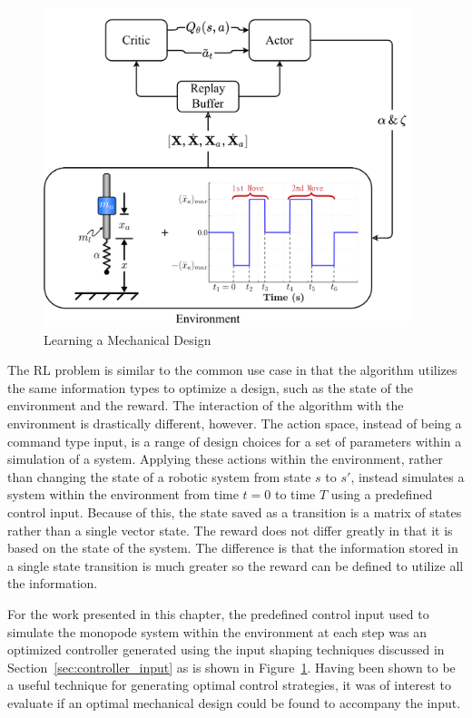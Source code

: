 % 
\begin{figure}[tb!]
        \centering
        \includegraphics[width=0.95\textwidth]{figures/Ch4/TD3_Mech_Params.drawio.png}  
        \caption{Learning a Mechanical Design}
        \label{fig:TD3_mech_design}
\end{figure}
% 

The RL problem is similar to the common use case in that the algorithm utilizes the same information types to optimize a design, such as the state of the environment and the reward. The interaction of the algorithm with the environment is drastically different, however. The action space, instead of being a command type input, is a range of design choices for a set of parameters within a simulation of a system. Applying these actions within the environment, rather than changing the state of a robotic system from state $s$ to $s'$, instead simulates a system within the environment from time $t=0$ to time $T$ using a predefined control input. Because of this, the state saved as a transition is a matrix of states rather than a single vector state. The reward does not differ greatly in that it is based on the state of the system. The difference is that the information stored in a single state transition is much greater so the reward can be defined to utilize all the information.

For the work presented in this chapter, the predefined control input used to simulate the monopode system within the environment at each step was an optimized controller generated using the input shaping techniques discussed in Section~\ref{sec:controller_input} as is shown in Figure~\ref{fig:TD3_mech_design}. Having been shown to be a useful technique for generating optimal control strategies, it was of interest to evaluate if an optimal mechanical design could be found to accompany the input.

